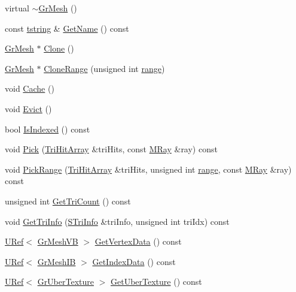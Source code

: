 \begin{CompactItemize}
\item 
virtual \hyperlink{class_gr_mesh_7c9e4336b2d7378db2ed663a06213d3d}{$\sim$GrMesh} ()
\item 
const \hyperlink{common__afx_8h_816fa58fd77499b0edb2c69ebe803d5c}{tstring} \& \hyperlink{class_gr_mesh_0e0a8a4a9bf673b8164599bb6b76c0a5}{GetName} () const 
\item 
\hyperlink{class_gr_mesh}{GrMesh} $\ast$ \hyperlink{class_gr_mesh_6881fa0be412c2e0d8efef6e1f4e5865}{Clone} ()
\item 
\hyperlink{class_gr_mesh}{GrMesh} $\ast$ \hyperlink{class_gr_mesh_52203681acabf93d8193f9111d0853a3}{CloneRange} (unsigned int \hyperlink{glext__bak_8h_7b8ad0b27a927682837f95528fa454f5}{range})
\item 
void \hyperlink{class_gr_mesh_ba35b1bb123116cae53994e78ea56758}{Cache} ()
\item 
void \hyperlink{class_gr_mesh_6c86454dab1da04bdda47d7aa1dcf363}{Evict} ()
\item 
bool \hyperlink{class_gr_mesh_884ad3e5c22eb0cd45bf633cdae8ac08}{IsIndexed} () const 
\item 
void \hyperlink{class_gr_mesh_abdbc531ac793a38243ab776d48de289}{Pick} (\hyperlink{class_u_fast_array}{TriHitArray} \&triHits, const \hyperlink{class_m_ray}{MRay} \&ray) const 
\item 
void \hyperlink{class_gr_mesh_460827f482933fc4d076225afdebd595}{PickRange} (\hyperlink{class_u_fast_array}{TriHitArray} \&triHits, unsigned int \hyperlink{glext__bak_8h_7b8ad0b27a927682837f95528fa454f5}{range}, const \hyperlink{class_m_ray}{MRay} \&ray) const 
\item 
unsigned int \hyperlink{class_gr_mesh_e7333b5704ae13ba18cc501569f5777f}{GetTriCount} () const 
\item 
void \hyperlink{class_gr_mesh_849176ce5be062beb72f947828846b2a}{GetTriInfo} (\hyperlink{struct_gr_mesh_1_1_s_tri_info}{STriInfo} \&triInfo, unsigned int triIdx) const 
\item 
\hyperlink{class_u_ref}{URef}$<$ \hyperlink{class_gr_mesh_v_b}{GrMeshVB} $>$ \hyperlink{class_gr_mesh_590cc2567fbac6ca8f5516319c911e04}{GetVertexData} () const 
\item 
\hyperlink{class_u_ref}{URef}$<$ \hyperlink{class_gr_mesh_i_b}{GrMeshIB} $>$ \hyperlink{class_gr_mesh_7ca8bc1bd71272eb87da9e4ada920735}{GetIndexData} () const 
\item 
\hyperlink{class_u_ref}{URef}$<$ \hyperlink{class_gr_uber_texture}{GrUberTexture} $>$ \hyperlink{class_gr_mesh_37000fa9e2a6d480b6956f862e8372d6}{GetUberTexture} () const 

\end{CompactItemize}
